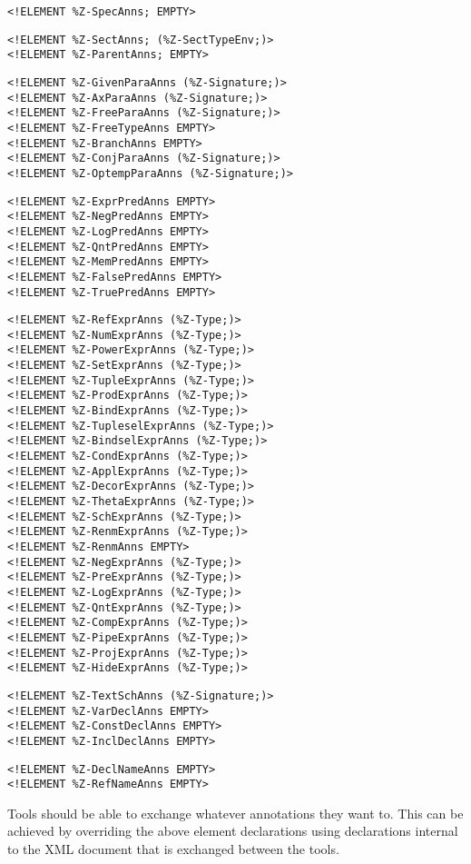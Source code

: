 \documentclass[a4paper,10pt]{article}
\begin{document}
\begin{verbatim}
<!ELEMENT %Z-SpecAnns; EMPTY>
\end{verbatim}
\begin{verbatim}
<!ELEMENT %Z-SectAnns; (%Z-SectTypeEnv;)>
<!ELEMENT %Z-ParentAnns; EMPTY>
\end{verbatim}
\begin{verbatim}
<!ELEMENT %Z-GivenParaAnns (%Z-Signature;)>
<!ELEMENT %Z-AxParaAnns (%Z-Signature;)>
<!ELEMENT %Z-FreeParaAnns (%Z-Signature;)>
<!ELEMENT %Z-FreeTypeAnns EMPTY>
<!ELEMENT %Z-BranchAnns EMPTY>
<!ELEMENT %Z-ConjParaAnns (%Z-Signature;)>
<!ELEMENT %Z-OptempParaAnns (%Z-Signature;)>
\end{verbatim}
\begin{verbatim}
<!ELEMENT %Z-ExprPredAnns EMPTY>
<!ELEMENT %Z-NegPredAnns EMPTY>
<!ELEMENT %Z-LogPredAnns EMPTY>
<!ELEMENT %Z-QntPredAnns EMPTY>
<!ELEMENT %Z-MemPredAnns EMPTY>
<!ELEMENT %Z-FalsePredAnns EMPTY>
<!ELEMENT %Z-TruePredAnns EMPTY>
\end{verbatim}
\begin{verbatim}
<!ELEMENT %Z-RefExprAnns (%Z-Type;)>
<!ELEMENT %Z-NumExprAnns (%Z-Type;)>
<!ELEMENT %Z-PowerExprAnns (%Z-Type;)>
<!ELEMENT %Z-SetExprAnns (%Z-Type;)>
<!ELEMENT %Z-TupleExprAnns (%Z-Type;)>
<!ELEMENT %Z-ProdExprAnns (%Z-Type;)>
<!ELEMENT %Z-BindExprAnns (%Z-Type;)>
<!ELEMENT %Z-TupleselExprAnns (%Z-Type;)>
<!ELEMENT %Z-BindselExprAnns (%Z-Type;)>
<!ELEMENT %Z-CondExprAnns (%Z-Type;)>
<!ELEMENT %Z-ApplExprAnns (%Z-Type;)>
<!ELEMENT %Z-DecorExprAnns (%Z-Type;)>
<!ELEMENT %Z-ThetaExprAnns (%Z-Type;)>
<!ELEMENT %Z-SchExprAnns (%Z-Type;)>
<!ELEMENT %Z-RenmExprAnns (%Z-Type;)>
<!ELEMENT %Z-RenmAnns EMPTY>
<!ELEMENT %Z-NegExprAnns (%Z-Type;)>
<!ELEMENT %Z-PreExprAnns (%Z-Type;)>
<!ELEMENT %Z-LogExprAnns (%Z-Type;)>
<!ELEMENT %Z-QntExprAnns (%Z-Type;)>
<!ELEMENT %Z-CompExprAnns (%Z-Type;)>
<!ELEMENT %Z-PipeExprAnns (%Z-Type;)>
<!ELEMENT %Z-ProjExprAnns (%Z-Type;)>
<!ELEMENT %Z-HideExprAnns (%Z-Type;)>
\end{verbatim}
\begin{verbatim}
<!ELEMENT %Z-TextSchAnns (%Z-Signature;)>
<!ELEMENT %Z-VarDeclAnns EMPTY>
<!ELEMENT %Z-ConstDeclAnns EMPTY>
<!ELEMENT %Z-InclDeclAnns EMPTY>
\end{verbatim}
\begin{verbatim}
<!ELEMENT %Z-DeclNameAnns EMPTY>
<!ELEMENT %Z-RefNameAnns EMPTY>
\end{verbatim}

Tools should be able to exchange whatever annotations they want to.
This can be achieved by overriding the above element declarations
using declarations internal to the XML document
that is exchanged between the tools.
\end{document}
